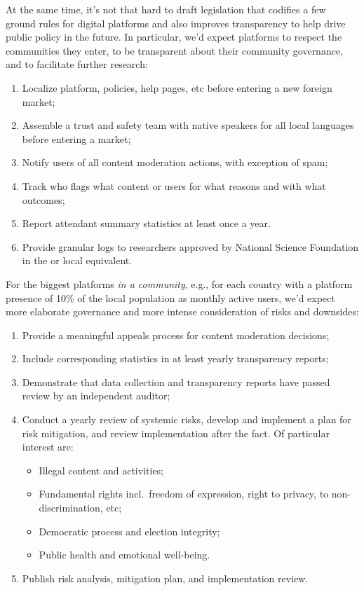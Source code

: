 At the same time, it's not that hard to draft legislation that codifies a few
ground rules for digital platforms and also improves transparency to help drive
public policy in the future. In particular, we'd expect platforms to respect the
communities they enter, to be transparent about their community governance, and
to facilitate further research:
\begin{enumerate}
    \item Localize platform, policies, help pages, etc before entering
        a new foreign market; \label{itm:law:localized}
    \item Assemble a trust and safety team with native speakers for all local
        languages before entering a market; \label{itm:law:team}
    \item Notify users of all content moderation actions, with exception of spam;
    \item Track who flags what content or users for what reasons and with what
        outcomes;
    \item Report attendant summary statistics at least once a year.
    \item Provide granular logs to researchers approved by National Science
        Foundation in the  or local equivalent. \label{itm:law:research}
\end{enumerate}
For the biggest platforms \emph{in a community}, e.g., for each country with a
platform presence of 10\% of the local population as monthly active users, we'd
expect more elaborate governance and more intense consideration of risks and
downsides:
\begin{enumerate}[resume]
    \item Provide a meaningful appeals process for content moderation decisions;
        \label{itm:law:appeals}
    \item Include corresponding statistics in at least yearly transparency
        reports;
    \item Demonstrate that data collection and transparency reports have passed
        review by an independent auditor;
    \item Conduct a yearly review of systemic risks, develop and implement a
        plan for risk mitigation, and review implementation after the fact. Of
        particular interest are:
        \begin{itemize}
            \item Illegal content and activities;
            \item Fundamental rights incl.\ freedom of expression, right to
                privacy, to non-discrimination, etc;
            \item Democratic process and election integrity;
            \item Public health and emotional well-being.
        \end{itemize} \label{itm:risk:review}
    \item Publish risk analysis, mitigation plan, and implementation review.
        \label{itm:law:publicrisk}
\end{enumerate}
